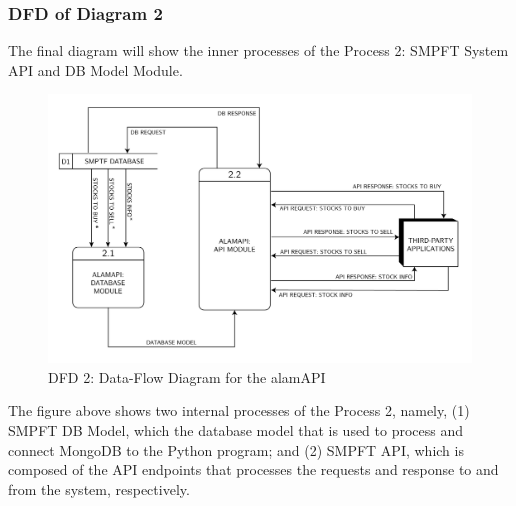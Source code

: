 \subsubsection{DFD of Diagram 2}
\label{subsubsec:dfd2}
The final diagram will show the inner processes of 
the Process 2: SMPFT System API and DB Model Module.
\begin{figure}[ht]
    \centering
    \includegraphics[width=1\textwidth]{./assets/Data Flow Diagram-04.png}
    \caption{DFD 2: Data-Flow Diagram for the alamAPI}
    \label{fig:dfd2}
\end{figure}
\FloatBarrier
\vspace{0.5cm}
The figure above shows two internal processes of the Process 2, namely, 
(1) SMPFT DB Model, which the database model that is used to process and 
connect MongoDB to the Python program; and 
(2) SMPFT API, which is composed of the API endpoints that processes 
the requests and response to and from the system, respectively.